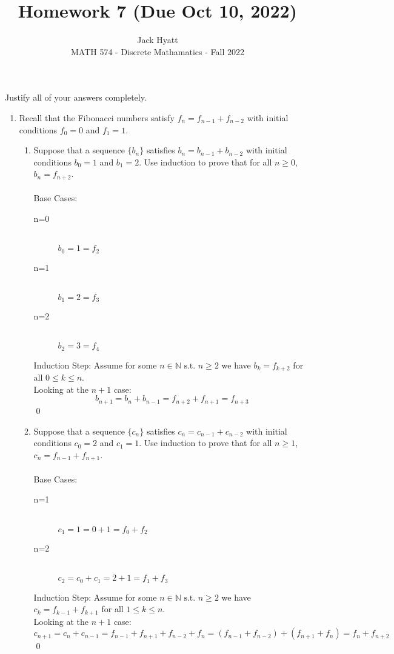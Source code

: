 \documentclass[12pt]{article}
\begin{document}
	
	
	
	\title{Homework 7 (Due Oct 10, 2022)}
	\author{Jack Hyatt\\ %
		MATH 574 - Discrete Mathamatics - Fall 2022} 
	
	\maketitle
	
	Justify all of your answers completely.\\
	
	\renewcommand{\qedsymbol}{$\blacksquare$}

\begin{enumerate}


\item Recall that the Fibonacci numbers satisfy $f_n = f_{n-1} + f_{n-2}$ with initial conditions $f_0 = 0$ and $f_1 = 1$. 
\begin{enumerate}
\item Suppose that a sequence $\{b_n\}$ satisfies $b_n = b_{n-1} + b_{n-2}$ with initial conditions $b_0= 1$ and $b_1 = 2$. Use induction to prove that for all $n \geq 0$, $b_n = f_{n+2}$.\\\\
Base Cases:
\begin{description}
	\item[n=0] \hfill \\ $b_0 = 1 = f_2$
	\item[n=1] \hfill \\ $b_1 = 2 = f_3$
	\item[n=2] \hfill \\ $b_2 = 3 = f_4$
\end{description}
Induction Step: Assume for some $n \in \mathbb{N} \text{ s.t. } n \geq 2$ we have $b_k = f_{k+2}$ for all $0\leq k\leq n$.\\
Looking at the $n+1$ case:
\[b_{n+1} = b_n + b_{n-1} = f_{n+2} + f_{n+1} = f_{n+3}\]\qed

\item Suppose that a sequence $\{c_n\}$ satisfies $c_n = c_{n-1} + c_{n-2}$ with initial conditions $c_0= 2$ and $c_1 = 1$. Use induction to prove that for all $n \geq 1$, $c_n = f_{n-1}+f_{n+1}$.\\\\
Base Cases:
\begin{description}
	\item[n=1] \hfill \\ $c_1 = 1 = 0 + 1 = f_0+f_2$
	\item[n=2] \hfill \\ $c_2 = c_0+c_1 = 2 + 1 = f_1+ f_3$
\end{description}
Induction Step: Assume for some $n \in \mathbb{N} \text{ s.t. } n \geq 2$ we have $c_k = f_{k-1}+f_{k+1}$ for all $1\leq k\leq n$.\\
Looking at the $n+1$ case:
\[c_{n+1} = c_n + c_{n-1} = f_{n-1}+f_{n+1} + f_{n-2}+f_{n} = (f_{n-1} + f_{n-2})+(f_{n+1}+f_{n})=f_n+f_{n+2}\]\qed



\end{enumerate}
\end{enumerate}
\end{document}
